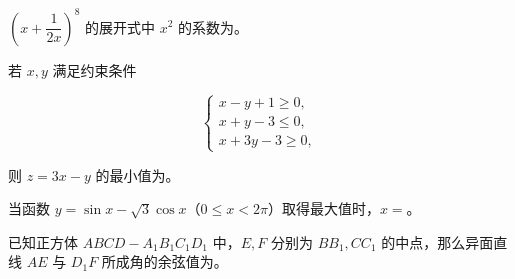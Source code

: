 \begin{question}
$\left(x+\dfrac1{2x}\right)^8$ 的展开式中 $x^2$ 的系数为\underline{\hspace{2cm}}。

\end{question}
\begin{question}
若 $x,y$ 满足约束条件

\nopagebreak[4]
\[
\begin{cases}
x-y+1\geq0,\\
x+y-3\leq0,\\
x+3y-3\geq0,
\end{cases}
\]

则 $z=3x-y$ 的最小值为\underline{\hspace{2cm}}。

\end{question}
\begin{question}
当函数 $y=\sin x-\sqrt3\cos x$（$0\leq x<2\pi$）取得最大值时，$x=$\underline{\hspace{2cm}}。

\end{question}
\begin{question}
已知正方体 $ABCD-A_1B_1C_1D_1$ 中，$E,F$ 分别为 $BB_1,CC_1$ 的中点，那么异面直线 $AE$ 与 $D_1F$ 所成角的余弦值为\underline{\hspace{2cm}}。

\end{question}


